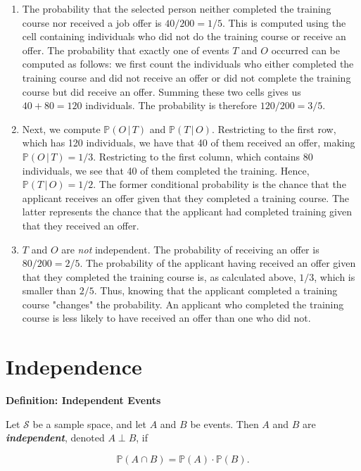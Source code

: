 \documentclass[11pt,letterpaper]{article}
\newcommand{\blocktitle}[1]{\par\addvspace{9pt}\noindent\textbf{#1}\par\nopagebreak\vspace{2pt}\nopagebreak}
\begin{document}
\begin{enumerate}[label=\alph*.]
\item The probability that the selected person neither completed the training course nor received a job offer is $40/200 = 1/5$. This is computed using the cell containing individuals who did not do the training course or receive an offer. The probability that exactly one of events $T$ and $O$ occurred can be computed as follows: we first count the individuals who either completed the training course and did not receive an offer or did not complete the training course but did receive an offer. Summing these two cells gives us $40 + 80 = 120$ individuals. The probability is therefore $120/200 = 3/5$.

  
\item Next, we compute $\mathbb P(O \,|\, T)$ and $\mathbb P(T \,|\, O)$. Restricting to the first row, which has 120 individuals, we have that 40 of them received an offer, making $\mathbb P(O \,|\, T) = 1/3$. Restricting to the first column, which contains 80 individuals, we see that 40 of them completed the training. Hence, $\mathbb P(T \,|\, O) = 1/2$. The former conditional probability is the chance that the applicant receives an offer given that they completed a training course. The latter represents the chance that the applicant had completed training given that they received an offer.

  
\item $T$ and $O$ are \emph{not} independent. The probability of receiving an offer is $80/200 = 2/5$. The probability of the applicant having received an offer given that they completed the training course is, as calculated above, $1/3$, which is smaller than $2/5$. Thus, knowing that the applicant completed a training course "changes" the probability. An applicant who completed the training course is less likely to have received an offer than one who did not.

\end{enumerate}

\clearpage
\section*{Independence}

\blocktitle{Definition: Independent Events}

Let $\mathcal S$ be a sample space, and let $A$ and $B$ be events. Then $A$ and $B$ are \emph{\textbf{independent}}, denoted $A \perp B$, if

\[
\mathbb P(A \cap B) = \mathbb P(A) \cdot \mathbb P(B).
\]
\end{document}
